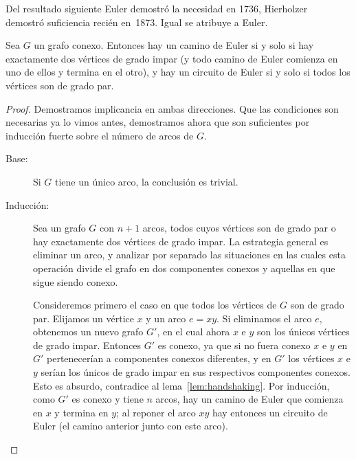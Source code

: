   Del resultado siguiente Euler demostró la necesidad en 1736,
  Hierholzer~%
    \cite{hierholzer73:_ueber_moegl_linien}
  demostró suficiencia recién en~1873.
  Igual se atribuye a Euler.
  \begin{theorem}[Euler]
    \label{theo:Euler-circuito-camino}
    Sea \(G\) un grafo conexo.
    Entonces hay un camino de Euler si y solo si
    hay exactamente dos vértices de grado impar
    (y todo camino de Euler comienza en uno de ellos
     y termina en el otro),
    y hay un circuito de Euler
    si y solo si todos los vértices son de grado par.
  \end{theorem}
  \begin{proof}
    Demostramos implicancia en ambas direcciones.
    Que las condiciones son necesarias ya lo vimos antes,
    demostramos ahora que son suficientes por inducción fuerte
    sobre el número de arcos de \(G\).%
    \begin{description}
    \item[Base:]
      Si \(G\) tiene un único arco,
      la conclusión es trivial.
    \item[Inducción:]
      Sea un grafo \(G\) con \(n + 1\) arcos,
      todos cuyos vértices son de grado par
      o hay exactamente dos vértices de grado impar.
      La estrategia general es eliminar un arco,
      y analizar por separado las situaciones
      en las cuales esta operación
      divide el grafo en dos componentes conexos
      y aquellas en que sigue siendo conexo.%

      Consideremos primero el caso en que todos los vértices
      de \(G\) son de grado par.
      Elijamos un vértice \(x\) y un arco \(e = x y\).
      Si eliminamos el arco \(e\),
      obtenemos un nuevo grafo \(G'\),
      en el cual ahora \(x\) e \(y\)
      son los únicos vértices de grado impar.
      Entonces \(G'\) es conexo,
      ya que si no fuera conexo
      \(x\) e \(y\) en \(G'\)
      pertenecerían a componentes conexos diferentes,
      y en \(G'\) los vértices \(x\) e \(y\)
      serían los únicos de grado impar
      en sus respectivos componentes conexos.
      Esto es absurdo,
      contradice al lema~\ref{lem:handshaking}.
      Por inducción,
      como \(G'\) es conexo y tiene \(n\) arcos,
      hay un camino de Euler
      que comienza en \(x\) y termina en \(y\);
      al reponer el arco \(x y\) hay entonces un circuito de Euler
      (el camino anterior junto con este arco).


\end{description}
\end{proof}
